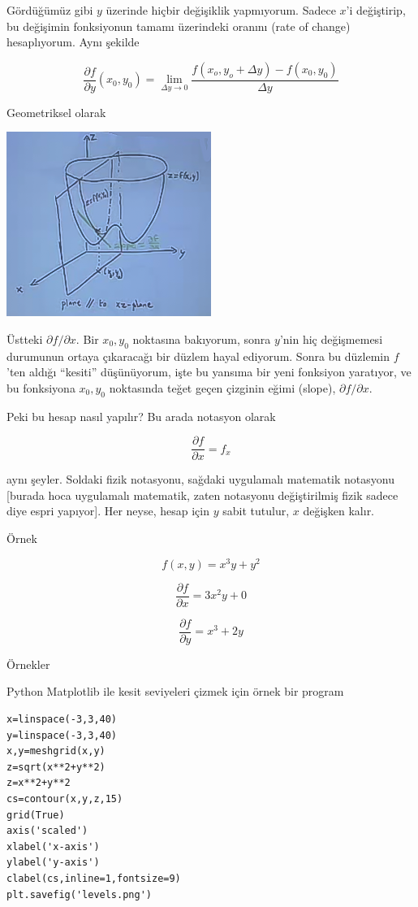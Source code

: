 \documentclass[12pt,fleqn]{article}\usepackage{../../common}
\begin{document}
Gördüğümüz gibi $y$ üzerinde hiçbir değişiklik yapmıyorum. Sadece $x$'i
değiştirip, bu değişimin fonksiyonun tamamı üzerindeki oranını (rate of
change) hesaplıyorum. Aynı şekilde

$$ \frac{\partial f}{\partial y}(x_0,y_0) = 
\lim_{\Delta y \to 0} \frac{f(x_o, y_o+\Delta y) - f(x_0,y_0)}{\Delta y}
 $$

Geometriksel olarak

\includegraphics[height=6cm]{8_16.png}

Üstteki $\partial f / \partial x$. Bir $x_0,y_0$ noktasına bakıyorum, sonra
$y$'nin hiç değişmemesi durumunun ortaya çıkaracağı bir düzlem hayal
ediyorum. Sonra bu düzlemin $f$'ten aldığı ``kesiti'' düşünüyorum, işte bu
yansıma bir yeni fonksiyon yaratıyor, ve bu fonksiyona $x_0,y_0$ noktasında
teğet geçen çizginin eğimi (slope), $\partial f / \partial x$.

Peki bu hesap nasıl yapılır? Bu arada notasyon olarak 

$$ \frac{\partial f}{\partial x} = f_x $$

aynı şeyler. Soldaki fizik notasyonu, sağdaki uygulamalı matematik
notasyonu [burada hoca uygulamalı matematik, zaten notasyonu değiştirilmiş
fizik sadece diye espri yapıyor]. Her neyse, hesap için $y$ sabit tutulur,
$x$ değişken kalır. 

Örnek

$$ f(x,y) = x^3y  + y^2 $$

$$ \frac{\partial f}{\partial x} = 3x^2y + 0$$

$$ \frac{\partial f}{\partial y} = x^3 + 2y$$

Örnekler 

Python Matplotlib ile kesit seviyeleri çizmek için örnek bir program

\begin{verbatim}
x=linspace(-3,3,40)
y=linspace(-3,3,40)
x,y=meshgrid(x,y)
z=sqrt(x**2+y**2)
z=x**2+y**2
cs=contour(x,y,z,15)
grid(True)
axis('scaled')
xlabel('x-axis')
ylabel('y-axis')
clabel(cs,inline=1,fontsize=9)
plt.savefig('levels.png')
\end{verbatim}
\end{document}
